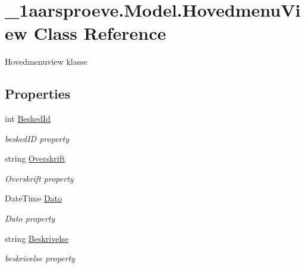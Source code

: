 \hypertarget{class__1aarsproeve_1_1_model_1_1_hovedmenu_view}{}\section{\+\_\+1aarsproeve.\+Model.\+Hovedmenu\+View Class Reference}
\label{class__1aarsproeve_1_1_model_1_1_hovedmenu_view}


Hovedmenuview klasse  


\subsection*{Properties}
\begin{DoxyCompactItemize}
\item 
int \hyperlink{class__1aarsproeve_1_1_model_1_1_hovedmenu_view_a35a1657a9b532a70e83a6c6c68a1a813}{Besked\+Id}
\begin{DoxyCompactList}\small\item\em besked\+I\+D property \end{DoxyCompactList}\item 
string \hyperlink{class__1aarsproeve_1_1_model_1_1_hovedmenu_view_ad8cb4e03fe1a8382191d1e92a15512d3}{Overskrift}
\begin{DoxyCompactList}\small\item\em Overskrift property \end{DoxyCompactList}\item 
Date\+Time \hyperlink{class__1aarsproeve_1_1_model_1_1_hovedmenu_view_a169f523fd87e85b7d2c2d9a4dfc77726}{Dato}
\begin{DoxyCompactList}\small\item\em Dato property \end{DoxyCompactList}\item 
string \hyperlink{class__1aarsproeve_1_1_model_1_1_hovedmenu_view_adfde4446d9f67ca95b06d0f7fd83dcc8}{Beskrivelse}
\begin{DoxyCompactList}\small\item\em beskrivelse property \end{DoxyCompactList}\item 

\end{DoxyCompactItemize}
